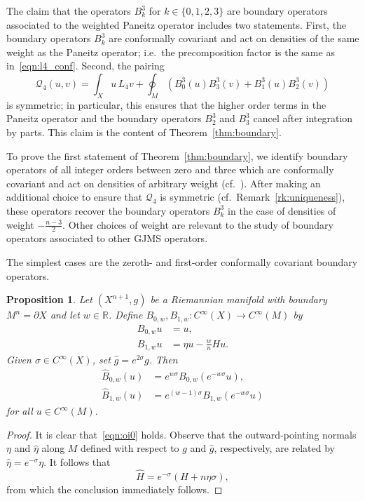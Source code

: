 \documentclass{amsart}
\newtheorem{prop}[thm]{Proposition}
\theoremstyle{definition}
\theoremstyle{remark}
\numberwithin{equation}{section}
\begin{document}
The claim that the operators $B_k^3$ for $k\in\{0,1,2,3\}$ are boundary operators associated to the weighted Paneitz operator includes two statements.  First, the boundary operators $B_k^3$ are conformally covariant and act on densities of the same weight as the Paneitz operator; i.e.\ the precomposition factor is the same as in~\eqref{eqn:l4_conf}.  Second, the pairing
\[ {\mathcal{Q}}_4(u,v) = \int_X u\,L_4v + \oint_M \left(B_0^3(u)B_3^3(v) + B_1^3(u)B_2^3(v)\right) \]
is symmetric; in particular, this ensures that the higher order terms in the Paneitz operator and the boundary operators $B_2^3$ and $B_3^3$ cancel after integration by parts.  This claim is the content of Theorem~\ref{thm:boundary}.

To prove the first statement of Theorem~\ref{thm:boundary}, we identify boundary operators of all integer orders between zero and three which are conformally covariant and act on densities of arbitrary weight (cf.\ \cite{GoverPeterson2015}).  After making an additional choice to ensure that ${\mathcal{Q}}_4$ is symmetric (cf.\ Remark~\ref{rk:uniqueness}), these operators recover the boundary operators $B_k^3$ in the case of densities of weight $-\frac{n-3}{2}$.  Other choices of weight are relevant to the study of boundary operators associated to other GJMS operators.

The simplest cases are the zeroth- and first-order conformally covariant boundary operators.

\begin{prop}
 \label{prop:oi01}
 Let $(X^{n+1},g)$ be a Riemannian manifold with boundary $M^n=\partial X$ and let $w\in{\mathbb{R}}$.  Define $B_{0,w},B_{1,w}\colon C^\infty(X)\to C^\infty(M)$ by
 \begin{align*}
  B_{0,w}u & = u, \\
  B_{1,w}u & = \eta u - \frac{w}{n}Hu .
 \end{align*}
 Given $\sigma\in C^\infty(X)$, set ${\widehat{g}}=e^{2\sigma}g$.  Then
 \begin{align}
  \label{eqn:oi0} {\widehat{B}}_{0,w}(u) & = e^{w\sigma}B_{0,w}\left(e^{-w\sigma}u\right) , \\
  \label{eqn:oi1} {\widehat{B}}_{1,w}(u) & = e^{(w-1)\sigma}B_{1,w}\left(e^{-w\sigma}u\right)
 \end{align}
 for all $u\in C^\infty(M)$.
\end{prop}

\begin{proof}
 It is clear that~\eqref{eqn:oi0} holds.  Observe that the outward-pointing normals $\eta$ and ${\widehat{\eta}}$ along $M$ defined with respect to $g$ and ${\widehat{g}}$, respectively, are related by ${\widehat{\eta}}=e^{-\sigma}\eta$.  It follows that
 \begin{equation}
  \label{eqn:Hprime} {\widehat{H}} = e^{-\sigma}\left(H + n\eta\sigma\right),
 \end{equation}
 from which the conclusion immediately follows.
\end{proof}
\end{document}
